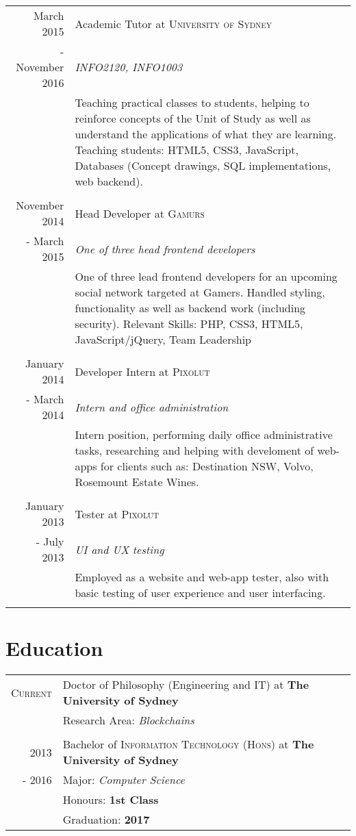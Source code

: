 \documentclass[10pt]{article}
\begin{document}
\begin{tabular}{r|p{11cm}}
March 2015 & Academic Tutor at \textsc{University of Sydney} \\ - November 2016 & \emph{INFO2120, INFO1003}\\&\footnotesize{Teaching practical classes to students, helping to reinforce concepts of the Unit of Study as well as understand the applications of what they are learning. Teaching students: HTML5, CSS3, JavaScript, Databases (Concept drawings, SQL implementations, web backend).}\\\multicolumn{2}{c}{} \\
November 2014 & Head Developer at \textsc{Gamurs} \\ - March 2015 & \emph{One of three head frontend developers} \\& \footnotesize{One of three lead frontend developers for an upcoming social network targeted at Gamers. Handled styling, functionality as well as backend work (including security). Relevant Skills: PHP, CSS3, HTML5, JavaScript/jQuery, Team Leadership} \\ \multicolumn{2}{c}{} \\
January 2014 & Developer Intern at \textsc{Pixolut} \\ - March 2014 & \emph{Intern and office administration}\\ & \footnotesize{Intern position, performing daily office administrative tasks, researching and helping with develoment of web-apps for clients such as: Destination NSW, Volvo, Rosemount Estate Wines.}\\\multicolumn{2}{c}{}\\
January 2013 & Tester at \textsc{Pixolut} \\ - July 2013 & \emph{UI and UX testing}\\ & \footnotesize{Employed as a website and web-app tester, also with basic testing of user experience and user interfacing. }\\\multicolumn{2}{c}{}\\
\end{tabular} 
\newpage
%
%
%
%
\section{Education}
\begin{tabular}{rl}	
\textsc{Current} & Doctor of Philosophy (Engineering and IT) at \textbf{The University of Sydney} \\
	& Research Area: \emph{Blockchains}\\\multicolumn{2}{c}{}\\
2013 & Bachelor of \textsc{Information Technology (Hons)} at \textbf{The University of Sydney} \\
- 2016 & Major: \emph{Computer Science}\\
	& Honours: \textbf{1st Class}\\
& Graduation: \textbf{2017}\\

\end{tabular}
\end{document}
